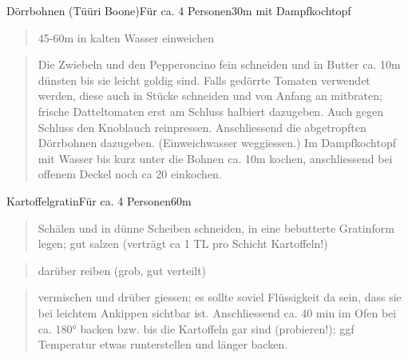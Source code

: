 \documentclass[
  a4paper,
]{article}
\begin{document}
\newpage

\begin{recipe}{Dörrbohnen (Tüüri Boone)}{Für ca. 4 Personen}{30m mit Dampfkochtopf}


\begin{quote}
45-60m in kalten Wasser einweichen
\end{quote}

\freeform\hrulefill


\begin{quote}
Die Zwiebeln und den Pepperoncino fein schneiden und in Butter ca. 10m
dünsten bis sie leicht goldig sind. Falls gedörrte Tomaten verwendet
werden, diese auch in Stücke schneiden und von Anfang an mitbraten;
frische Datteltomaten erst am Schluss halbiert dazugeben. Auch gegen
Schluss den Knoblauch reinpressen. Anschliessend die abgetropften
Dörrbohnen dazugeben. (Einweichwasser weggiessen.) Im Dampfkochtopf mit
Wasser bis kurz unter die Bohnen ca. 10m kochen, anschliessend bei
offenem Deckel noch ca 20 einkochen.
\end{quote}

\freeform\hrulefill\newline\freeform{}\end{recipe}

\newpage

\begin{recipe}{Kartoffelgratin}{Für ca. 4 Personen}{60m}


\begin{quote}
Schälen und in dünne Scheiben schneiden, in eine bebutterte Gratinform
legen; gut salzen (verträgt ca 1 TL pro Schicht Kartoffeln!)
\end{quote}

\freeform\hrulefill


\begin{quote}
darüber reiben (grob, gut verteilt)
\end{quote}

\freeform\hrulefill


\begin{quote}
vermischen und drüber giessen; es sollte soviel Flüssigkeit da sein,
dass sie bei leichtem Ankippen sichtbar ist. Anschliessend ca. 40 min im
Ofen bei ca. 180° backen bzw. bis die Kartoffeln gar sind (probieren!);
ggf Temperatur etwas runterstellen und länger backen.
\end{quote}

\freeform\hrulefill\newline\freeform{}\end{recipe}
\end{document}
